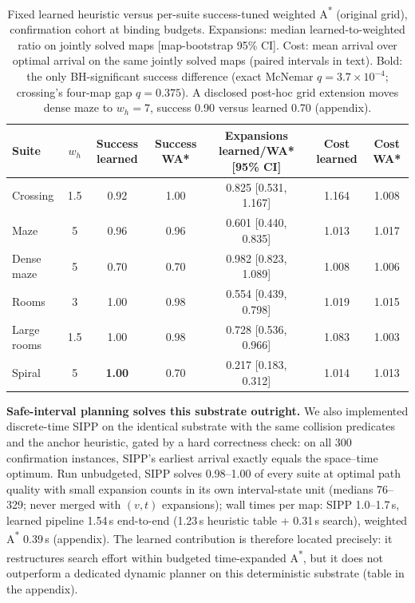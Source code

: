 \documentclass[letterpaper]{article} %
\begin{document}
\begin{table}[t]
\centering
\small
\begin{tabular}{lcccccc}
\toprule
Suite & $w_h$ & Success learned & Success WA* & Expansions learned/WA* [95\% CI] & Cost learned & Cost WA* \\
\midrule
Crossing & 1.5 & 0.92 & 1.00 & 0.825 [0.531, 1.167] & 1.164 & 1.008 \\
Maze & 5 & 0.96 & 0.96 & 0.601 [0.440, 0.835] & 1.013 & 1.017 \\
Dense maze & 5 & 0.70 & 0.70 & 0.982 [0.823, 1.089] & 1.008 & 1.006 \\
Rooms & 3 & 1.00 & 0.98 & 0.554 [0.439, 0.798] & 1.019 & 1.015 \\
Large rooms & 1.5 & 1.00 & 0.98 & 0.728 [0.536, 0.966] & 1.083 & 1.003 \\
Spiral & 5 & \textbf{1.00} & 0.70 & 0.217 [0.183, 0.312] & 1.014 & 1.013 \\
\bottomrule
\end{tabular}
\caption{Fixed learned heuristic versus per-suite success-tuned weighted A\textsuperscript{*} (original grid), confirmation cohort at binding budgets. Expansions: median learned-to-weighted ratio on jointly solved maps [map-bootstrap 95\% CI]. Cost: mean arrival over optimal arrival on the same jointly solved maps (paired intervals in text). Bold: the only BH-significant success difference (exact McNemar $q{=}3.7\times10^{-4}$; crossing's four-map gap $q{=}0.375$). A disclosed post-hoc grid extension moves dense maze to $w_h{=}7$, success 0.90 versus learned 0.70 (appendix).}
\label{tab:wastar-main}
\end{table}

\textbf{Safe-interval planning solves this substrate outright.} We also implemented discrete-time SIPP \citep{phillips2011sipp} on the identical substrate with the same collision predicates and the anchor heuristic, gated by a hard correctness check: on all 300 confirmation instances, SIPP's earliest arrival exactly equals the space--time optimum. Run unbudgeted, SIPP solves 0.98--1.00 of every suite at optimal path quality with small expansion counts in its own interval-state unit (medians 76--329; never merged with $(v,t)$ expansions); wall times per map: SIPP 1.0--1.7\,s, learned pipeline 1.54\,s end-to-end (1.23\,s heuristic table + 0.31\,s search), weighted A\textsuperscript{*} 0.39\,s (appendix). The learned contribution is therefore located precisely: it restructures search effort within budgeted time-expanded A\textsuperscript{*}, but it does not outperform a dedicated dynamic planner on this deterministic substrate (table in the appendix).
\end{document}
